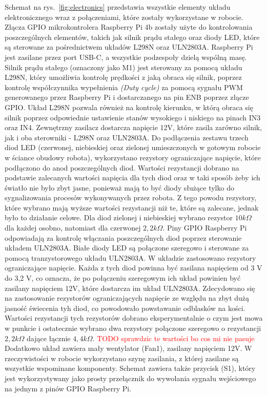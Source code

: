 Schemat na rys.~\ref{fig:electronics} przedstawia wszystkie elementy układu elektronicznego wraz z połączeniami, które zostały wykorzystane w robocie.
Złącza GPIO mikrokontrolera Raspberry Pi 4b zostały użyte do kontrolowania poszczególnych elementów, takich jak silnik prądu stałego oraz diody LED, które są sterowane za 
pośrednictwem układów L298N oraz ULN2803A. Raspberry Pi jest zasilane przez port USB-C, a wszystkie podzespoły dzielą wspólną masę.
Silnik prądu stałego (oznaczony jako M1) jest sterowany za pomocą układu L298N, który umożliwia kontrolę prędkości z jaką obraca się silnik, poprzez kontrolę współczynnika wypełnienia \textit{(Duty cycle)} 
za pomocą sygnału PWM generowanego przez Raspberry Pi i dostarczanego na pin ENB poprzez złącze GPIO. Układ L298N pozwala również na kontrolę kierunku, w którą obraca się silnik poprzez
odpowiednie ustawienie stanów wysokiego i niskiego na pinach IN3 oraz IN4.
Zewnętrzny zasilacz dostarcza napięcie 12V, które zasila zarówno silnik, jak i oba sterowniki - L298N oraz ULN2803A.
Do podłączenia zestawu trzech diod LED (czerwonej, niebieskiej oraz zielonej umieszczonych w gotowym robocie w ściance obudowy robota), wykorzystano rezystory ograniczające napięcie, które podłączono 
do anod poszczególnych diod. Wartości rezystancji dobrano na podstawie zalecanych wartości napięcia dla tych diod oraz w taki sposób żeby ich światło nie było zbyt jasne, ponieważ 
mają to być diody służące tylko do sygnalizowania procesów wykonywanych przez robota. Z tego powodu rezystory, które wybrano mają wyższe wartości rezystancji niż te, które są zalecane, jednak było to
działanie celowe. Dla diod zielonej i niebieskiej wybrano rezystor $10 k\Omega$ dla każdej osobno, natomiast dla czerwonej $2,2 k\Omega$. Piny GPIO Raspberry Pi odpowiadają za kontrolę włączania poszczególnych diod poprzez sterowanie układem ULN2803A.
Białe diody LED są połączone szeregowo i sterowane za pomocą tranzystorowego układu ULN2803A. W układzie zastosowano rezystory ograniczające napięcie. Każda z tych diod powinna być 
zasilana napięciem od 3 V do 3,2 V, co oznacza, że po połączeniu szeregowym ich układ powinien być zasilany napięciem 12V, które dostarcza im układ ULN2803A. Zdecydowano się na zastosowanie
rezystorów ograniczających napięcie ze względu na zbyt dużą jasność świecenia tyh diod, co powodowało powstawanie odblasków na kości. Wartości rezystancji tych rezystorów dobrano eksperymentalnie o czym jest mowa w punkcie
i ostatecznie wybrano dwa rezystory połączone szeregowo o rezystancji $2,2 k\Omega$ dające łącznie $4,4 k\Omega$. \textcolor{red}{TODO sprawdzic te wartości bo cos mi nie pasuje}
Dodatkowo układ zawiera mały wentylator (Fan1), zasilany napięciem 12V. W rzeczywistości w robocie wykorzystano szynę zasilania, z której zasilane są wszystkie wspominane komponenty. 
Schemat zawiera także przycisk (S1), który jest wykorzystywany jako prosty przełącznik do wywołania sygnału wejściowego na jednym z pinów GPIO Raspberry Pi.

